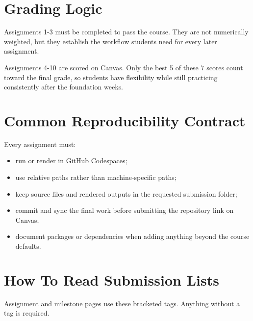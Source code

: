 \documentclass[
  letterpaper,
  DIV=11,
  numbers=noendperiod,
  oneside]{scrreprt}
\providecommand{\tightlist}{%
  \setlength{\itemsep}{0pt}\setlength{\parskip}{0pt}}
\begin{document}
\section*{Grading Logic}\label{grading-logic}


Assignments 1-3 must be completed to pass the course. They are not
numerically weighted, but they establish the workflow students need for
every later assignment.

Assignments 4-10 are scored on Canvas. Only the best 5 of these 7 scores
count toward the final grade, so students have flexibility while still
practicing consistently after the foundation weeks.

\section*{Common Reproducibility
Contract}\label{common-reproducibility-contract}


Every assignment must:

\begin{itemize}
\tightlist
\item
  run or render in GitHub Codespaces;
\item
  use relative paths rather than machine-specific paths;
\item
  keep source files and rendered outputs in the requested submission
  folder;
\item
  commit and sync the final work before submitting the repository link
  on Canvas;
\item
  document packages or dependencies when adding anything beyond the
  course defaults.
\end{itemize}

\section*{How To Read Submission
Lists}\label{how-to-read-submission-lists}


Assignment and milestone pages use these bracketed tags. Anything
without a tag is required.
\end{document}
